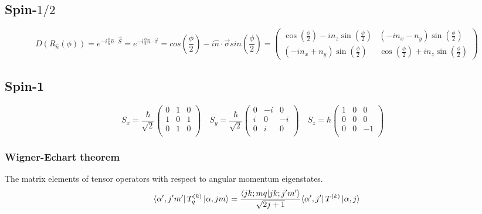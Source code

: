 \subsection{Spin-$1/2$} 
\[ 
D(R_{\hat{n}}(\phi)) = e^{-i\frac{\phi}{\hbar}\hat{n}\cdot\vec{S}} = e^{-i\frac{\phi}{2}\hat{n}\cdot\vec{\sigma}} = 
cos(\frac{\phi}{2}) - i \hat{n} \cdot \vec{\sigma} sin(\frac{\phi}{2}) = 
\begin{pmatrix}
    \cos(\frac{\phi}{2}) - in_{z}\sin(\frac{\phi}{2}) & (-i n_{x} - n_{y})\sin(\frac{\phi}{2}) \\ 
    (-i n_{x} + n_{y})\sin(\frac{\phi}{2}) &  \cos(\frac{\phi}{2}) + in_{z}\sin(\frac{\phi}{2})  
\end{pmatrix}
\]

\subsection{Spin-1}
\begin{equation}
    S_x=\frac{\hbar}{\sqrt{2}}
    \begin{pmatrix}
	0   & 1	& 0 \\
	1   & 0	& 1 \\
	0   & 1	& 0 \\
    \end{pmatrix}\quad
    S_y=\frac{\hbar}{\sqrt{2}}
    \begin{pmatrix}
	0   & -i    & 0 \\
	i   & 0	& -i \\
	0   & i	& 0 \\
    \end{pmatrix}\quad
    S_z=\hbar
    \begin{pmatrix}
	1   & 0	& 0 \\
	0   & 0	& 0 \\
	0   & 0	& -1 \\
    \end{pmatrix}\quad
\end{equation}

\subsubsection{Wigner-Echart theorem}
The matrix elements of tensor operators with respect to angular momentum
eigenstates.
\begin{equation}
    \bra{\alpha^\prime,j^{\prime}m^\prime}T^{(k)}_{q}\ket{\alpha,jm}
    =\frac{\bra{jk;mq}\ket{jk;j^{\prime}m^\prime}}{\sqrt{2j+1}}{\bra{\alpha^\prime,j^\prime}T^{(k)}\ket{\alpha,j}}
\end{equation}


